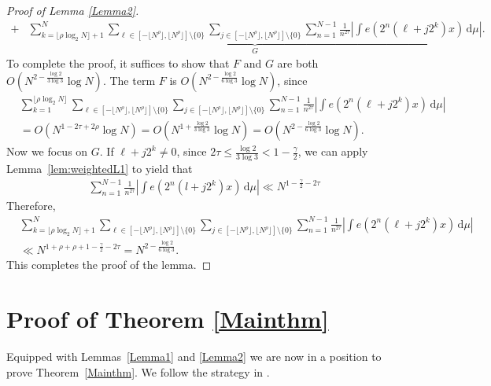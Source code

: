 \documentclass[amssymb,amsfonts,refcheck,12pt,verbatim,righttag]{amsart}
\numberwithin{equation}{section} %
\theoremstyle{plain}
\begin{document}
\begin{proof}[Proof of Lemma \ref{Lemma2}]
\begin{align*}
		+& \underbrace{\sum_{k=\lfloor\rho \log_{2}N \rfloor+1}^{N}\sum_{\ell\in [-\lfloor N^{ \rho}\rfloor,\lfloor N^{ \rho}\rfloor]\setminus\{0\}}\sum_{j\in [-\lfloor N^{ \rho}\rfloor,\lfloor N^{ \rho}\rfloor]\setminus\{0\}} \sum_{n=1}^{N-1}\frac{1}{n^{2\tau}}\left|\int e(2^{n}(\ell+j2^k)x)\, \mathrm{d}\mu\right|}_{G}.
	\end{align*}
	To complete the proof, it suffices to show that $F$ and $G$ are both $O\left(N^{2-\frac{\log2}{3\log3}}\log N\right).$ 
    The term $F$ is $O\left(N^{2-\frac{\log2}{6\log3}}\log N\right)$, since
	\begin{align*}
		&\sum_{k=1}^{\lfloor\rho \log_{2}N \rfloor}\sum_{\ell\in [-\lfloor N^{ \rho}\rfloor,\lfloor N^{ \rho}\rfloor]\setminus\{0\}}\! \sum_{j\in [-\lfloor N^{ \rho}\rfloor,\lfloor N^{ \rho}\rfloor]\setminus\{0\}} \!\sum_{n=1}^{N-1}\frac{1}{n^{2 \tau}}\left|\int e(2^{n}(\ell+j2^k)x)\, \mathrm{d}\mu\right| \\
        &=O(N^{1-2\tau+2\rho}\log N)
     =O\left(N^{1+\frac{\log2}{3\log3}}\log N\right)=O\left(N^{2-\frac{\log2}{6\log3}}\log N\right).
	\end{align*}
	 Now we focus on $G$. If $\ell+j2^{k}\neq 0$, since $2\tau\leq\frac{\log2}{3\log3}<1-\frac{\gamma}{2}$, we can apply Lemma~\ref{lem:weightedL1} to yield that
	\begin{align*}
		\sum_{n=1}^{N-1}\frac{1}{n^{2\tau}}\left|\int e(2^{n}(l+j2^k)x)\, \mathrm{d}\mu\right|\ll N^{1-\frac{\gamma}{2}-2\tau}
	\end{align*}
	Therefore, 
	\begin{align*}
		&\sum_{k=\lfloor\rho\log_{2}N \rfloor+1}^{N}\sum_{\ell\in [-\lfloor N^{ \rho}\rfloor,\lfloor N^{ \rho}\rfloor]\setminus\{0\}}\sum_{j\in [-\lfloor N^{\rho} \rfloor,\lfloor N^{ \rho}\rfloor]\setminus\{0\}} \sum_{n=1}^{N-1}\frac{1}{n^{2\tau}}\left|\int e(2^{n}(\ell+j2^k)x)\, \mathrm{d}\mu\right| \\
		&\ll N^{1+\rho+\rho+1-\frac{\gamma}{2}-2\tau}
		=N^{2-\frac{\log2}{6\log3}}.
	\end{align*}
	This completes the proof of the lemma.  
\end{proof}


\section{Proof of Theorem \ref{Mainthm}}\label{Sec:Mainthm}

Equipped with Lemmas~\ref{Lemma1} and  \ref{Lemma2} we are now in a position to prove Theorem~\ref{Mainthm}. We follow the strategy in \cite[Section 2.3]{Baker25A}. 
\end{document}
